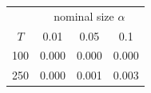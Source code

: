 % 
\begin{tabular}{cccc}
  \hline
  & \multicolumn{3}{c}{nominal size $\alpha$} \\
 $T$ & 0.01 & 0.05 & 0.1 \\
 \hline
100 & 0.000 & 0.000 & 0.000 \\ 
  250 & 0.000 & 0.001 & 0.003 \\ 
   \hline
\end{tabular}
